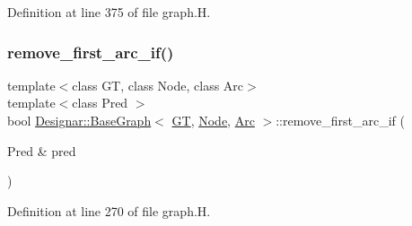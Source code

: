 Definition at line 375 of file graph.\+H.

\mbox{\label{class_designar_1_1_base_graph_ae45255ef62c056e76c5e5c45182e9490}} 
\subsubsection{\texorpdfstring{remove\+\_\+first\+\_\+arc\+\_\+if()}{remove\_first\_arc\_if()}\hspace{0.1cm}{\footnotesize\ttfamily [1/2]}}
{\footnotesize\ttfamily template$<$class GT, class Node, class Arc$>$ \\
template$<$class Pred $>$ \\
bool \hyperlink{class_designar_1_1_base_graph}{Designar\+::\+Base\+Graph}$<$ \hyperlink{demo-buildgraph_8_c_a3001c40d2c31ca87ed96cd7d1334a55e}{GT}, \hyperlink{namespace_designar_a5af326c65aa2bd26b26c410f2030d09e}{Node}, \hyperlink{namespace_designar_a3f55fb5513d62ff47cbc8f72b8e95d6f}{Arc} $>$\+::remove\+\_\+first\+\_\+arc\+\_\+if (\begin{DoxyParamCaption}\item[{Pred \&}]{pred }\end{DoxyParamCaption})\hspace{0.3cm}{\ttfamily [inline]}}



Definition at line 270 of file graph.\+H.

\mbox{\label{class_designar_1_1_base_graph_a990426c9e87f922bbbd0c9bc4d2cedd8}} 
